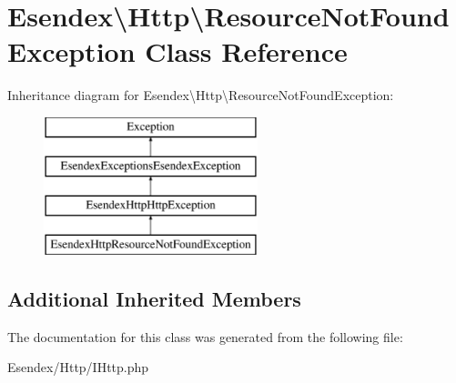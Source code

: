 \section{Esendex\textbackslash{}Http\textbackslash{}Resource\-Not\-Found\-Exception Class Reference}
\label{class_esendex_1_1_http_1_1_resource_not_found_exception}
Inheritance diagram for Esendex\textbackslash{}Http\textbackslash{}Resource\-Not\-Found\-Exception\-:\begin{figure}[H]
\begin{center}
\leavevmode
\includegraphics[height=4.000000cm]{class_esendex_1_1_http_1_1_resource_not_found_exception}
\end{center}
\end{figure}
\subsection*{Additional Inherited Members}


The documentation for this class was generated from the following file\-:\begin{DoxyCompactItemize}
\item 
Esendex/\-Http/I\-Http.\-php\end{DoxyCompactItemize}

